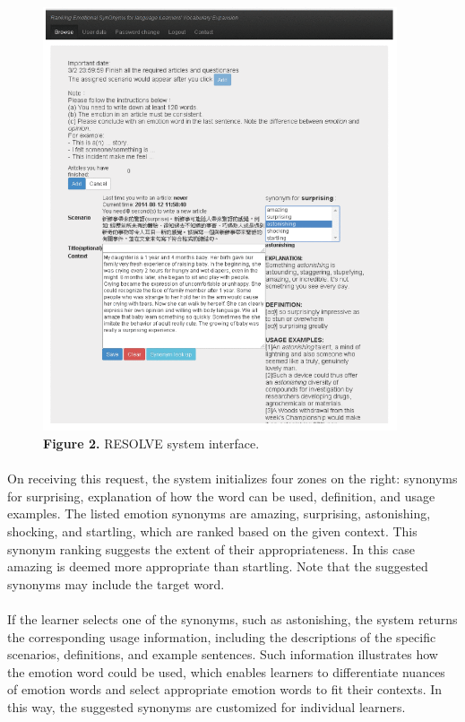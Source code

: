 \documentclass[a4paper,12pt,oneside]{article}
\let\counterwithin\relax
\begin{document}
\begin{figure}[H]
\includegraphics[height=12.5cm,width=10.46cm]{Figure2.png}
\centering
\caption{\textbf{Figure 2.} RESOLVE system interface.}
\end{figure}

\paragraph{}
On receiving this request, the system initializes four zones on the right: synonyms for surprising, explanation of how the word can be used, definition, and usage examples. The listed emotion synonyms are amazing, surprising, astonishing, shocking, and startling, which are ranked based on the given context. This synonym ranking suggests the extent of their appropriateness. In this case amazing is deemed more appropriate than startling. Note that the suggested synonyms may include the target word. 
\paragraph{}
If the learner selects one of the synonyms, such as astonishing, the system returns the corresponding usage information, including the descriptions of the specific scenarios, definitions, and example sentences. Such information illustrates how the emotion word could be used, which enables learners to differentiate nuances of emotion words and select appropriate emotion words to fit their contexts. In this way, the suggested synonyms are customized for individual learners. 
\end{document}
